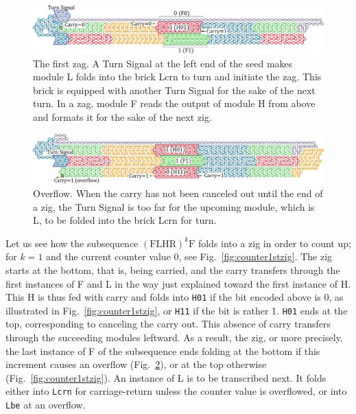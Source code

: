 \documentclass[twocolumn]{svjour3}
\begin{document}
\begin{figure}[tb]
\centering
\includegraphics[width=\linewidth]{CounterEx11_1.pdf}
\caption{
The first zag. 
A Turn Signal at the left end of the seed makes module L folds into the brick Lcrn to turn and initiate the zag. 
This brick is equipped with another Turn Signal for the sake of the next turn. 
In a zag, module F reads the output of module H from above and formats it for the sake of the next zig. 
}
\label{fig:counter1stzag}
\end{figure}

\begin{figure}[tb]
\centering
\includegraphics[width=\linewidth]{CounterEx13_1.pdf}
\caption{
Overflow. 
When the carry has not been canceled out until the end of a zig, the Turn Signal is too far for the upcoming module, which is L, to be folded into the brick Lcrn for turn. 
}
\label{fig:overflowex1}
\end{figure}

Let us see how the subsequence $(\mathrm{FLHR})^k \mathrm{F}$ folds into a zig in order to count up; for $k=1$ and the current counter value 0, see Fig.~\ref{fig:counter1stzig}.
The zig starts at the bottom, that is, being carried, and the carry transfers through the first instances of F and L in the way just explained toward the first instance of H.
This H is thus fed with carry and folds into \texttt{H01} if the bit encoded above is 0, as illustrated in Fig.~\ref{fig:counter1stzig}, or \texttt{H11} if the bit is rather 1.
\texttt{H01} ends at the top, corresponding to canceling the carry out.
This absence of carry transfers through the succeeding modules leftward.
As a result, the zig, or more precisely, the last instance of F of the subsequence ends folding at the bottom if this increment causes an overflow (Fig.~\ref{fig:overflowex1}), or at the top otherwise (Fig.~\ref{fig:counter1stzig}).
An instance of L is to be transcribed next.
It folds either into \texttt{Lcrn} for carriage-return unless the counter value is overflowed, or into \texttt{Lbe} at an overflow.
\end{document}
